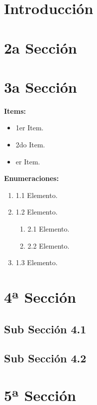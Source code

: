 \section{Introducción}

\section{2a Sección}
\label{sec:2Seccion}

\section{3a Sección}
\label{sec:3Seccion}

\textbf{Items:}

\begin{itemize}
	\item 1er Item.
  \item 2do Item.
  \item er Item.
\end{itemize}

\textbf{Enumeraciones:}

\begin{enumerate}
	\item 1.1 Elemento.
	\item 1.2 Elemento.
  \begin{enumerate}
		\item 2.1 Elemento.
		\item 2.2 Elemento.
  \end{enumerate}
	\item 1.3 Elemento.
\end{enumerate}

\section{4ª Sección}
\label{sec:4Sección}

\subsection{Sub Sección 4.1}
\label{sec:41SubSección}

\subsection{Sub Sección 4.2}
\label{sec:42SubSección}

\section{5ª Sección}
\label{sec:Sección4}

